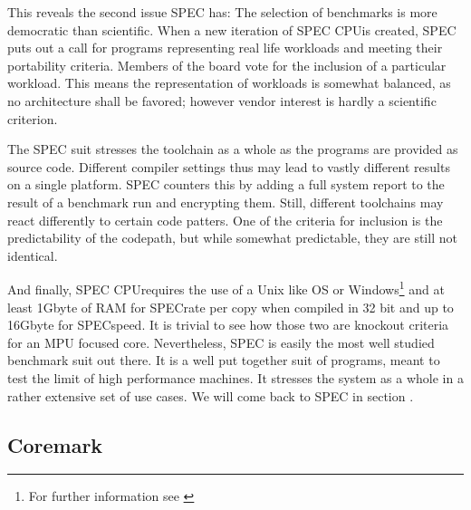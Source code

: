 \documentclass[../bachelor_paper.tex]{subfiles}
\begin{document}
This reveals the second issue SPEC has: The selection of benchmarks is more democratic than scientific. When a new iteration of SPEC CPU\rsym is created, SPEC puts out a call for programs representing real life workloads and meeting their portability criteria. Members of the board vote for the inclusion of a particular workload. \cite{henningSPECCPU2000Measuring2000} This means the representation of workloads is somewhat balanced, as no architecture shall be favored; however vendor interest is hardly a scientific criterion. 

The SPEC suit stresses the toolchain as a whole as the programs are provided as source code. Different compiler settings thus may lead to vastly different results on a single platform. SPEC counters this by adding a full system report to the result of a benchmark run and encrypting them. \cite{bucekSPECCPU2017NextGeneration2018} Still, different toolchains may react differently to certain code patters. One of the criteria for inclusion is the predictability of the codepath, but while somewhat predictable, they are still not identical. 

And finally, SPEC CPU\rsym requires the use of a Unix like \acs{OS} or Windows\footnote{For further information see \cite{SystemRequirementsCPU}} and at least 1Gbyte of \acs{RAM} for SPECrate per copy when compiled in 32 bit and up to 16Gbyte for SPECspeed. It is trivial to see how those two are knockout criteria for an \acs{MPU} focused core. Nevertheless, SPEC is easily the most well studied benchmark suit out there. It is a well put together suit of programs, meant to test the limit of high performance machines. It stresses the system as a whole in a rather extensive set of use cases. We will come back to SPEC in section .

\subsection*{Coremark}


\isstandalone



\fi
\end{document}
